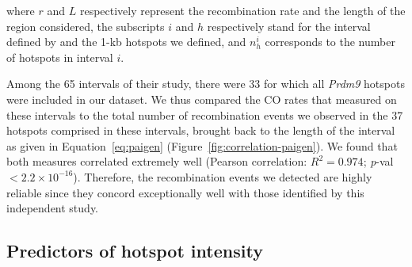 where $r$ and $L$ respectively represent the recombination rate and the length of the region considered, the subscripts $i$ and $h$ respectively stand for the interval defined by \citet{paigen2008recombinational} and the 1-kb hotspots we defined, and $n_h^i$ corresponds to the number of hotspots in interval $i$.

Among the 65 intervals of their study, there were 33 for which all \textit{Prdm9} hotspots were included in our dataset.
We thus compared the CO rates that \citet{paigen2008recombinational} measured on these intervals to the total number of recombination events we observed in the 37 hotspots comprised in these intervals, brought back to the length of the interval as given in Equation~\ref{eq:paigen} (Figure~\ref{fig:correlation-paigen}).
We found that both measures correlated extremely well (Pearson correlation: $R^2 = 0.974$; \textit{p}-val $< 2.2 \times 10^{-16}$).
Therefore, the recombination events we detected are highly reliable since they concord exceptionally well with those identified by this independent study.





\subsection{Predictors of hotspot intensity}%



